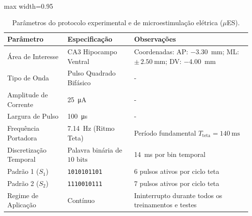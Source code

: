 \begin{table}[tbp]
    \centering
    \setlength{\tabcolsep}{5pt}
    \caption{Parâmetros do protocolo experimental e de microestimulação elétrica ($\mu$ES).}
    \label{tab:protocolo_ceua}
    \begin{adjustbox}{max width=0.95\textwidth}
        \begin{tabular}{lll}
            \toprule
            \textbf{Parâmetro}     & \textbf{Especificação}              & \textbf{Observações}                                                                                      \\
            \midrule
            Área de Interesse      & CA3 Hipocampo Ventral               & Coordenadas: AP: \qty{-3.30}{\milli\meter}; ML: $\pm\,\qty{2.50}{\milli\meter}$; DV: \qty{-4.00}{\milli\meter} \\
            Tipo de Onda           & Pulso Quadrado Bifásico             & -                                                                                                         \\
            Amplitude de Corrente  & \qty{25}{\micro\ampere}              & -                                                                                                         \\
            Largura de Pulso       & \qty{100}{\micro\second}             & -                                                                                                         \\
            Frequência Portadora   & \qty{7.14}{\hertz} (Ritmo Teta)      & Período fundamental $T_{\text{teta}} = \qty{140}{\milli\second}$                                           \\
            Discretização Temporal & Palavra binária de $10\text{ bits}$ & \qty{14}{\milli\second} por bin temporal                                                                  \\
            Padrão 1 ($S_1$)       & \texttt{1010101101}                 & 6 pulsos ativos por ciclo teta                                                                            \\
            Padrão 2 ($S_2$)       & \texttt{1110010111}                 & 7 pulsos ativos por ciclo teta                                                                            \\
            Regime de Aplicação    & Contínuo                            & Ininterrupto durante todos os treinamentos e testes                                                       \\
            \bottomrule
        \end{tabular}
    \end{adjustbox}
\end{table}